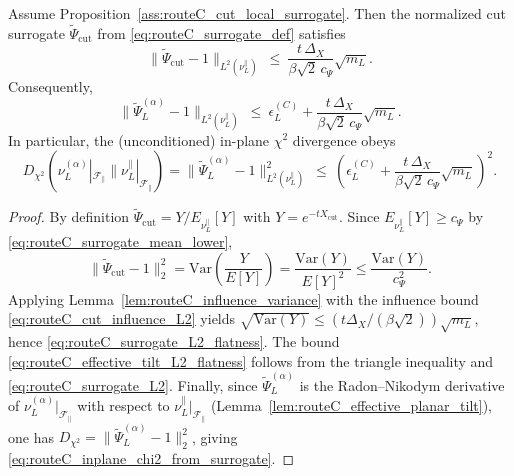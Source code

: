 \begin{lemma}\label{lem:routeC_surrogate_implies_chi2_flatness}
Assume Proposition~\ref{ass:routeC_cut_local_surrogate}.
Then the normalized cut surrogate $\widetilde\Psi_{\mathrm{cut}}$ from \eqref{eq:routeC_surrogate_def} satisfies
\begin{equation}\label{eq:routeC_surrogate_L2_flatness}
\bigl\|\widetilde\Psi_{\mathrm{cut}}-1\bigr\|_{L^2(\nu_L^{\parallel})}
\ \le\
\frac{t\,\Delta_X}{\beta\sqrt2\,c_{\Psi}}\sqrt{m_L}.
\end{equation}
Consequently,
\begin{equation}\label{eq:routeC_effective_tilt_L2_flatness}
\bigl\|\widetilde\Psi_L^{(\alpha)}-1\bigr\|_{L^2(\nu_L^{\parallel})}
\ \le\
\epsilon_L^{(C)}+\frac{t\,\Delta_X}{\beta\sqrt2\,c_{\Psi}}\sqrt{m_L}.
\end{equation}
In particular, the (unconditioned) in-plane $\chi^2$ divergence obeys
\begin{equation}\label{eq:routeC_inplane_chi2_from_surrogate}
D_{\chi^2}\!\left(\nu_L^{(\alpha)}|_{\mathscr F_{\parallel}}\Big\| \nu_L^{\parallel}|_{\mathscr F_{\parallel}}\right)
=
\bigl\|\widetilde\Psi_L^{(\alpha)}-1\bigr\|_{L^2(\nu_L^{\parallel})}^2
\ \le\
\left(\epsilon_L^{(C)}+\frac{t\,\Delta_X}{\beta\sqrt2\,c_{\Psi}}\sqrt{m_L}\right)^2.
\end{equation}
\end{lemma}

\begin{proof}
By definition $\widetilde\Psi_{\mathrm{cut}}=Y/E_{\nu_L^{\parallel}}[Y]$ with $Y=e^{-tX_{\mathrm{cut}}}$.
Since $E_{\nu_L^{\parallel}}[Y]\ge c_{\Psi}$ by \eqref{eq:routeC_surrogate_mean_lower},
\[
\bigl\|\widetilde\Psi_{\mathrm{cut}}-1\bigr\|_{2}^2
=\mathrm{Var}\!\left(\frac{Y}{E[Y]}\right)
=\frac{\mathrm{Var}(Y)}{E[Y]^2}
\le \frac{\mathrm{Var}(Y)}{c_{\Psi}^2}.
\]
Applying Lemma~\ref{lem:routeC_influence_variance} with the influence bound \eqref{eq:routeC_cut_influence_L2} yields
$\sqrt{\mathrm{Var}(Y)}\le (t\Delta_X/(\beta\sqrt2))\sqrt{m_L}$,
hence \eqref{eq:routeC_surrogate_L2_flatness}.
The bound \eqref{eq:routeC_effective_tilt_L2_flatness} follows from the triangle inequality and \eqref{eq:routeC_surrogate_L2}.
Finally, since $\widetilde\Psi_L^{(\alpha)}$ is the Radon--Nikodym derivative of $\nu_L^{(\alpha)}|_{\mathscr F_{\parallel}}$ with respect to
$\nu_L^{\parallel}|_{\mathscr F_{\parallel}}$ (Lemma~\ref{lem:routeC_effective_planar_tilt}),
one has $D_{\chi^2}=\|\widetilde\Psi_L^{(\alpha)}-1\|_2^2$, giving \eqref{eq:routeC_inplane_chi2_from_surrogate}.
\end{proof}

